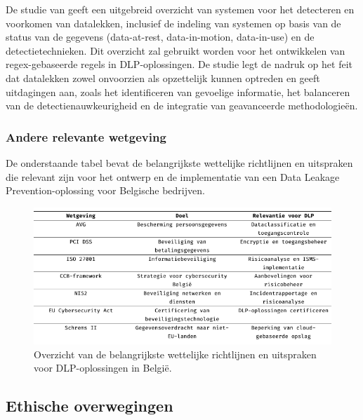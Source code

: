 De studie van \textcite{Nayak2020} geeft een uitgebreid overzicht van systemen voor het detecteren en voorkomen van datalekken, 
inclusief de indeling van systemen op basis van de status van de gegevens (data-at-rest, data-in-motion, dat\-a-in-use) en de detectietechnieken. 
Dit overzicht zal gebruikt worden voor het ontwikkelen van regex-gebaseerde regels in DLP-oploss\-ingen. 
De studie legt de nadruk op het feit dat datalekken zowel onvoorzien als opzettelijk kunnen optreden en geeft uitdagingen aan, 
zoals het identificeren van gevoelige informatie, het balanceren van de detectienauwkeurigheid en de integratie van geavanceerde methodologieën.


\subsubsection{Andere relevante wetgeving}%

De onderstaande tabel bevat de belangrijkste wettelijke richtlijnen en uitspraken die relevant zijn voor het ontwerp en de implementatie van een Data Leakage Prevention-oplossing voor Belgische bedrijven.

\begin{figure}
    \centering
    \includegraphics[scale=0.50]
    {img/overzicht.png}
    \caption{\label{fig:overzicht}Overzicht van de belangrijkste wettelijke richtlijnen en uitspraken voor DLP-oplossingen in België.}
  \end{figure}

\subsection{Ethische overwegingen}%

